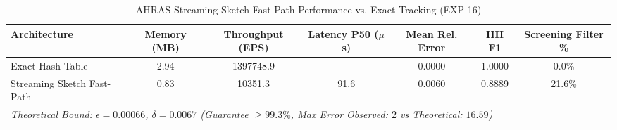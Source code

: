\begin{table}[t]
\centering
\small
\caption{AHRAS Streaming Sketch Fast-Path Performance vs. Exact Tracking (EXP-16)}
\label{tab:streaming_sketch_eval}
\begin{tabular}{lcccccc}
\toprule
\textbf{Architecture} & \textbf{Memory (MB)} & \textbf{Throughput (EPS)} & \textbf{Latency P50 ($\mu$s)} & \textbf{Mean Rel. Error} & \textbf{HH F1} & \textbf{Screening Filter \%} \\
\midrule
Exact Hash Table & 2.94 & 1397748.9 & -- & 0.0000 & 1.0000 & 0.0\% \\
Streaming Sketch Fast-Path & 0.83 & 10351.3 & 91.6 & 0.0060 & 0.8889 & 21.6\% \\
\midrule
\multicolumn{7}{l}{\textit{Theoretical Bound: $\epsilon = 0.00066$, $\delta = 0.0067$ (Guarantee $\ge 99.3\%$, Max Error Observed: $2$ vs Theoretical: $16.59$)}} \\
\bottomrule
\end{tabular}
\end{table}
